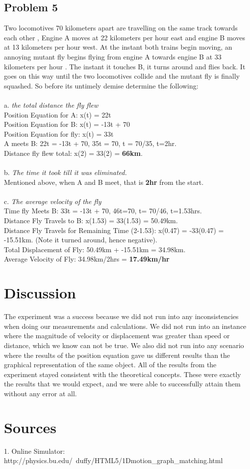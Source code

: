 \documentclass{article}
\begin{document}
\subsection{Problem 5} 
Two locomotives 70 kilometers apart are travelling on the same track towards each other , Engine A  moves at 22 kilometers per hour east  and engine B moves at 13 kilometers per hour west.  At the instant both trains begin moving, an annoying mutant fly begins flying from engine A towards engine B at 33 kilometers per hour . The instant it touches B, it turns around and flies back. It goes on  this way until the two locomotives collide and the mutant fly is finally squashed. So before its untimely demise determine the following: \\ \\
a. \textit{the total distance the fly flew}\\ 
    Position Equation for A: x(t) = 22t \\
    Position Equation for B: x(t) = -13t + 70 \\
    Position Equation for fly: x(t) = 33t \\
    A meets B: 22t = -13t + 70, 35t = 70, t = 70/35, t=2hr. \\
    Distance fly flew total: x(2) = 33(2) = \textbf{66km}. \\ \\
b. \textit{The time it took till it was eliminated.}\\
    Mentioned above, when A and B meet, that is \textbf{2hr} from the start. \\ \\ 
c. \textit{The average velocity of the fly} \\ 
    Time fly Meets B: 33t = -13t + 70, 46t=70, t= 70/46, t=1.53hrs. \\
    Distance Fly Travels to B: x(1.53) = 33(1.53) = 50.49km. \\
    Distance Fly Travels for Remaining Time (2-1.53): x(0.47) = -33(0.47) = -15.51km. (Note it turned around, hence negative). \\ 
    Total Displacement of Fly: 50.49km + -15.51km = 34.98km. \\ 
    Average Velocity of Fly: 34.98km/2hrs = \textbf{17.49km/hr}
\section{Discussion} 
The experiment was a success because we did not run into any inconsistencies when doing our measurements and calculations. We did not run into an instance where the magnitude of velocity or displacement was greater than speed or distance, which we know can not be true. We also did not run into any scenario where the results of the position equation gave us different results than the graphical representation of the same object. All of the results from the experiment stayed consistent with the theoretical concepts. These were exactly the results that we would expect, and we were able to successfully attain them without any error at all. 

\section{Sources}
1. Online Simulator: http://physics.bu.edu/~duffy/HTML5/1Dmotion\_graph\_matching.html 
\end{document}
